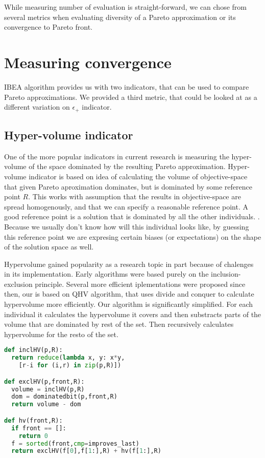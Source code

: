 \documentclass[12pt,oneside]{fithesis2}
\begin{document}
While measuring number of evaluation is straight-forward, we can chose from several metrics when evaluating diversity of a Pareto approximation or its convergence to Pareto front. 

\section{Measuring convergence}
IBEA algorithm provides us with two indicators, that can be used to compare Pareto approximations. We provided a third metric, that could be looked at as a different variation on $\epsilon_+$ indicator.

\subsection{Hyper-volume indicator}
One of the more popular indicators in current research is measuring the hyper-volume of the space dominated by the resulting Pareto approximation. Hyper-volume indicator is based on idea of calculating the volume of objective-space that given Pareto aproximation dominates, but is dominated by some reference point $R$. This works with assumption that the results in objective-space are spread homogenously, and that we can specify a reasonable reference point. A good reference point is a solution that is dominated by all the other individuals. \cite{auger2009theory}. Because we usually don't know how will this individual looks like, by guessing this reference point we are expresing certain biases (or expectations) on the shape of the solution space as well.

Hypervolume gained popularity as a research topic in part because of chalenges in its implementation. Early algorithms were based purely on the inclusion-exclusion principle\cite{wu2001metrics}. Several more efficient iplementations were proposed since then, our is based on QHV algorithm\cite{russo2012quick}, that uses divide and conquer to calculate hypervolume more efficiently. Our algorithm is significantly simplified. For each individual it calculates the hypervolume it covers and then substracts parts of the volume that are dominated by rest of the set. Then recursively calculates hypervolume for the resto of the set.

\begin{lstlisting}[language=Python,label=eps_example,caption=Hypervolume indicator implementation]
def inclHV(p,R):
  return reduce(lambda x, y: x*y,
    [r-i for (i,r) in zip(p,R)])

def exclHV(p,front,R):
  volume = inclHV(p,R)
  dom = dominatedbit(p,front,R)
  return volume - dom

def hv(front,R):
  if front == []:
    return 0
  f = sorted(front,cmp=improves_last) 
  return exclHV(f[0],f[1:],R) + hv(f[1:],R)
\end{lstlisting}
\end{document}
